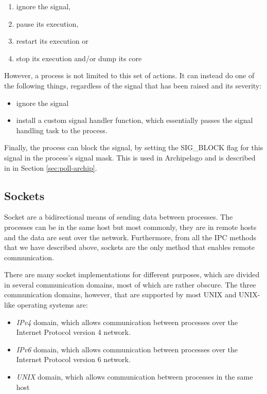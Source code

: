 \begin{enumerate}
	\item ignore the signal,
	\item pause its execution,
	\item restart its execution or
	\item stop its execution and/or dump its core
\end{enumerate}

However, a process is not limited to this set of actions. It can instead do one 
of the following things, regardless of the signal that has been raised and its 
severity:

\begin{itemize}
	\item ignore the signal
	\item install a custom signal handler function, which essentially 
		passes the signal handling task to the process.
\end{itemize}

Finally, the process can block the signal, by setting the SIG\_BLOCK flag for 
this signal in the process's signal mask. This is used in Archipelago and is 
described in in Section \ref{sec:poll-archip}.

\subsection{Sockets}

Socket are a bidirectional means of sending data between processes. The 
processes can be in the same host but most commonly, they are in remote hosts 
and the data are sent over the network. Furthermore, from all the IPC methods 
that we have described above, sockets are the only method that enables remote 
communication. 

There are many socket implementations for different purposes, which are divided 
in several communication domains, most of which are rather obscure. The three 
communication domains, however, that are supported by most UNIX and UNIX-like 
operating systems are:

\begin{itemize}
	\item \textit{IPv4} domain, which allows communication between 
		processes over the Internet Protocol version 4 network.
	\item \textit{IPv6} domain, which allows communication between 
		processes over the Internet Protocol version 6 network.
	\item \textit{UNIX} domain, which allows communication between 
		processes in the same host
\end{itemize}

